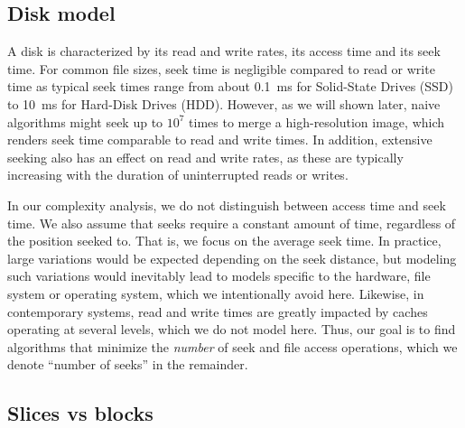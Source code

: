 \documentclass[10pt, conference, compsocconf]{IEEEtran}
\begin{document}
\subsection{Disk model}

A disk is characterized by its read and write rates, its access time
and its seek time. For common file sizes, seek time is negligible
compared to read or write time as typical seek times range from about 0.1~ms
for Solid-State Drives (SSD) to 10~ms for Hard-Disk
Drives (HDD). However, as we will shown later, naive algorithms might
seek up to $10^7$ times to merge a high-resolution image, which
renders seek time comparable to read and write times. In addition,
extensive seeking also has an effect on read and write rates, as these
are typically increasing with the duration of uninterrupted reads or
writes.

In our complexity analysis, we do not distinguish between access time
and seek time.  We also assume that seeks require a constant amount of
time, regardless of the position seeked to. That is, we focus on the
average seek time. In practice, large variations would be expected
depending on the seek distance, but modeling such variations would
inevitably lead to models specific to the hardware, file system or
operating system, which we intentionally avoid here. Likewise, in
contemporary systems, read and write times are greatly impacted by caches
operating at several levels, which we do not model here. Thus, our
goal is to find algorithms that minimize the \emph{number} of seek and
file access operations, which we denote ``number of seeks'' in the
remainder.

\subsection{Slices vs blocks}
\end{document}
